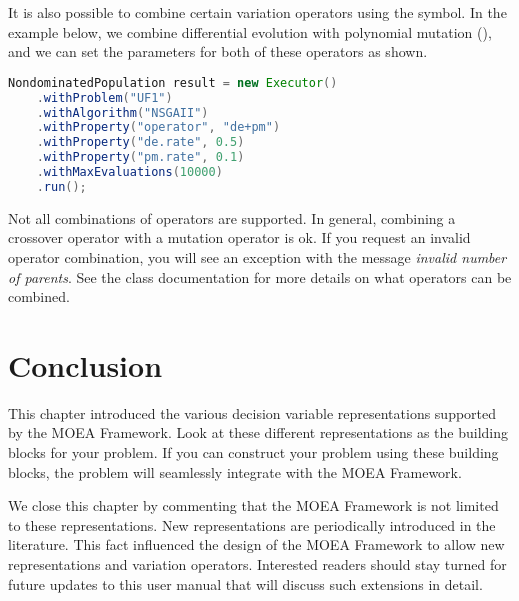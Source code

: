 It is also possible to combine certain variation operators using the \java{+} symbol.  In the example below, we combine differential evolution with polynomial mutation (), and we can set the parameters for both of these operators as shown.
\begin{lstlisting}[language=Java]
NondominatedPopulation result = new Executor()
    .withProblem("UF1")
    .withAlgorithm("NSGAII")
    .withProperty("operator", "de+pm")
    .withProperty("de.rate", 0.5)
    .withProperty("pm.rate", 0.1)
    .withMaxEvaluations(10000)
    .run();
\end{lstlisting}

\begin{important}
Not all combinations of operators are supported.  In general, combining a crossover operator with a mutation operator is ok.  If you request an invalid operator combination, you will see an exception with the message \emph{invalid number of parents}.  See the  class documentation for more details on what operators can be combined.
\end{important}

\section{Conclusion}
This chapter introduced the various decision variable representations supported by the MOEA Framework.  Look at these different representations as the building blocks for your problem.  If you can construct your problem using these building blocks, the problem will seamlessly integrate with the MOEA Framework.

We close this chapter by commenting that the MOEA Framework is not limited to these representations.  New representations are periodically introduced in the literature.  This fact influenced the design of the MOEA Framework to allow new representations and variation operators.  Interested readers should stay turned for future updates to this user manual that will discuss such extensions in detail.